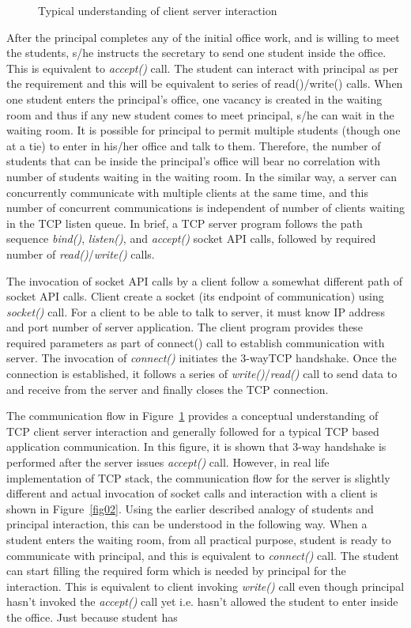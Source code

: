 \begin{multicols}{2}
\begin{figure}[H]
\caption{Typical understanding of client server interaction}\label{fig01}
\end{figure}

After the principal completes any of the initial office work, and is willing to meet the students, s/he instructs the secretary to send one student inside the office. This is equivalent to \textit{accept()} call. The student can interact with principal as per the requirement and this will be equivalent to series of read()/write() calls. When one student enters the principal’s office, one vacancy is created in the waiting room and thus if any new student comes to meet principal, s/he can wait in the waiting room. It is possible for principal to permit multiple students (though one at a tie) to enter in his/her office and talk to them. Therefore, the number of students that can be inside the principal’s office will bear no correlation with number of students waiting in the waiting room. In the similar way, a server can concurrently communicate with multiple clients at the same time, and this number of concurrent communications is independent of number of clients waiting in the TCP listen queue. In brief, a TCP server program follows the path sequence \textit{bind()}, \textit{listen()}, and \textit{accept()} socket API calls, followed by required number of \textit{read()}/\textit{write()} calls. 

The invocation of socket API calls by a client follow a somewhat different path of socket API calls. Client create a socket (its endpoint of communication) using \textit{socket()} call. For a client to be able to talk to server, it must know IP address and port number of server application.  The client program provides these required parameters as part of connect() call to establish communication with server. The invocation of \textit{connect()} initiates the 3-wayTCP  handshake. Once the connection is established, it follows a series of \textit{write()}/\textit{read()} call to send data to and receive from the server and finally closes the TCP connection.

The communication flow in Figure~\ref{fig01} provides a conceptual understanding of TCP client server interaction and generally followed for a typical TCP based application communication. In this figure, it is shown that 3-way handshake is performed after the server issues \textit{accept()} call. However, in real life implementation of TCP stack, the communication flow for the server is slightly different and actual invocation of socket calls and interaction with a client is shown in Figure~\ref{fig02}. Using the earlier described analogy of students and principal interaction, this can be understood in the following way. When a student enters the waiting room, from all practical purpose, student is ready to communicate with principal, and this is equivalent to \textit{connect()} call. The student can start filling the required form which is needed by principal for the interaction. This is equivalent to client invoking \textit{write()} call even though principal hasn’t invoked the \textit{accept()} call yet i.e. hasn’t allowed the student to enter inside the office. Just because student has 


\end{multicols}
